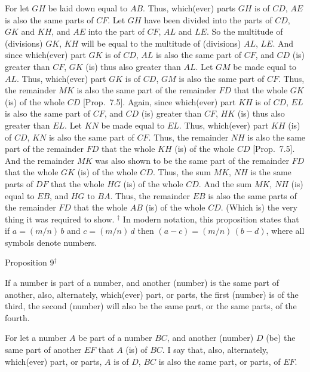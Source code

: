 For let $GH$ be laid down equal to $AB$. Thus, which(ever) parts $GH$ is of $CD$,
$AE$ is also the same parts of $CF$. Let $GH$ have been divided into the parts
of $CD$, $GK$ and $KH$, and $AE$ into the part of $CF$, $AL$ and $LE$. So the
multitude of (divisions) $GK$, $KH$ will be equal to the multitude of (divisions)
$AL$, $LE$. And since which(ever) part $GK$ is of $CD$, $AL$ is also the same part 
of $CF$, and $CD$ (is) greater than $CF$,  $GK$ (is) thus also greater than $AL$.
Let $GM$ be made equal to $AL$. Thus, which(ever) part $GK$ is of $CD$, $GM$ is also the same part of $CF$. Thus, the remainder $MK$ is also the same part of the
remainder $FD$ that  the whole $GK$ (is) of the whole $CD$ [Prop.~7.5]. Again, since
which(ever) part $KH$ is of $CD$, $EL$ is also the same part of $CF$, and
$CD$ (is) greater than $CF$, $HK$ (is) thus also greater than $EL$. Let $KN$ be
made equal to $EL$. Thus, which(ever) part $KH$ (is) of $CD$, $KN$ is also the
same part of $CF$. Thus, the remainder $NH$ is also the same part 
of the remainder $FD$ that the whole $KH$ (is) of the whole $CD$  [Prop.~7.5]. And the remainder $MK$
was also shown to be the same part of the remainder $FD$ that the whole
$GK$ (is) of the whole $CD$. Thus, the sum $MK$, $NH$ is the same parts of
$DF$ that the whole $HG$ (is) of the whole $CD$. And the sum $MK$, $NH$
(is) equal to $EB$, and $HG$ to $BA$. Thus, the remainder $EB$ is also
the same parts of the remainder $FD$ that the whole $AB$ (is)
of the whole $CD$. (Which is) the very thing it was required to show.
{\footnotesize\noindent$^\dag$ In modern notation, this
proposition states that if $a=(m/n)\,b$ and $c=(m/n)\,d$ then $(a-c)=
(m/n)\,(b-d)$, where all symbols denote numbers.}


\begin{center}
{\large Proposition 9}$^\dag$
\end{center}

If a number is part of a number, and another (number) is the same part of another, also, alternately, which(ever)
part, or parts,  the first (number)  is of the third, the second (number) will also be the same
part, or the same parts, of the fourth.

\epsfysize=2in
\centerline{}

For let a number $A$ be part of a number $BC$, and another (number) $D$ (be) the same
part of another $EF$ that $A$ (is) of $BC$. I say that, also, alternately, which(ever) part, or
parts, $A$ is of $D$, $BC$ is also the same part, or parts, of $EF$.

